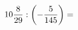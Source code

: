 \documentclass[preview]{standalone}
\begin{document}
\begin{align*}
10 { 8 \over 29 }  :  \left( - { 5 \over 145 } \right)  =
\end{align*}
\end{document}
